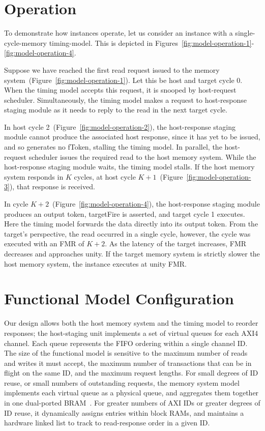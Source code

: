 \vspace{-0.251in}
\section{Operation}\label{sec:memory-model-operation}
To demonstrate how \PNAME instances operate, let us consider an instance with a
single-cycle-memory timing-model. This is depicted in Figures~\ref{fig:model-operation-1}-\ref{fig:model-operation-4}.

Suppose we have reached the first read request issued to the memory
system~(Figure~\ref{fig:model-operation-1}).  Let this be host and target cycle
0. When the timing model accepts this request, it is snooped by
host-request scheduler.  Simultaneously, the timing model makes a request
to host-response staging module as it needs to reply to the read in the next
target cycle.

In host cycle 2~(Figure~\ref{fig:model-operation-2}), the host-response staging module cannot produce
the associated host response, since it has yet to be issued, and so generates
no fToken, stalling the timing model. In parallel, the host-request scheduler
issues the required read to the host memory system.
While the host-response staging module waits, the timing model
stalls. If the host memory system responds in $K$ cycles, at host
cycle $K+1$~(Figure~\ref{fig:model-operation-3}), that response is received.

In cycle $K+2$~(Figure~\ref{fig:model-operation-4}), the host-response staging module produces an
output token, targetFire is asserted, and target cycle 1 executes. Here the
timing model forwards the data directly into its output token.
From the target's perspective, the read occurred in a single cycle, however,
the cycle was executed with an FMR of $K+2$.  As the latency of the
target increases, FMR decreases and approaches unity.  If the
target memory system is strictly slower the host memory system, the instance
executes at unity FMR.
\vspace{-0.10in}
\section{Functional Model Configuration}\label{egress}
Our design allows both the host memory system and the timing model to reorder
responses; the host-staging unit implements a set of virtual queues for each
AXI4 channel. Each queue represents the FIFO ordering within a single channel
ID. The size of the functional model is sensitive to the maximum number of reads
and writes it must accept, the maximum number of transactions that can be in
flight on the same ID, and the maximum request lengths. For small degrees of ID
reuse, or small numbers of outstanding requests, the memory system model
implements each virtual queue as a physical queue, and aggregates them together in one dual-ported
BRAM~\cite{LIFPGADesign}. For greater numbers of AXI IDs or greater degrees of ID
reuse, it dynamically assigns entries within block RAMs, and maintains a
hardware linked list to track to read-response order in a given ID.

